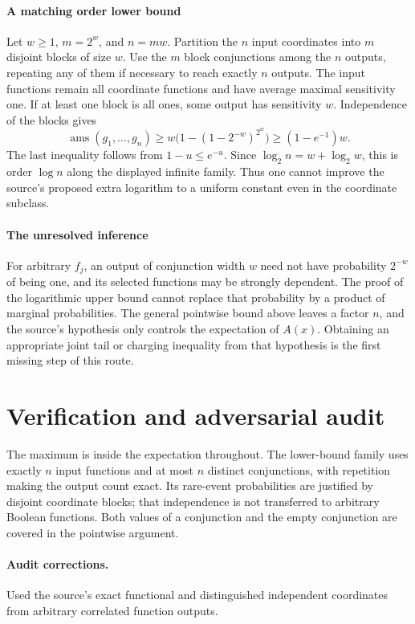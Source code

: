 \documentclass[11pt]{article}
\begin{document}
\paragraph{A matching order lower bound}
Let $w\geq1$, $m=2^w$, and $n=mw$. Partition the $n$ input coordinates into $m$ disjoint blocks of size $w$. Use the $m$ block conjunctions among the $n$ outputs, repeating any of them if necessary to reach exactly $n$ outputs. The input functions remain all coordinate functions and have average maximal sensitivity one. If at least one block is all ones, some output has sensitivity $w$. Independence of the blocks gives
\[
 \operatorname{ams}(g_1,\ldots,g_n)
 \geq w\bigl(1-(1-2^{-w})^{2^w}\bigr)
 \geq(1-e^{-1})w.
\]
The last inequality follows from $1-u\leq e^{-u}$. Since $\log_2n=w+\log_2w$, this is order $\log n$ along the displayed infinite family. Thus one cannot improve the source's proposed extra logarithm to a uniform constant even in the coordinate subclass.

\paragraph{The unresolved inference}
For arbitrary $f_j$, an output of conjunction width $w$ need not have probability $2^{-w}$ of being one, and its selected functions may be strongly dependent. The proof of the logarithmic upper bound cannot replace that probability by a product of marginal probabilities. The general pointwise bound above leaves a factor $n$, and the source's hypothesis only controls the expectation of $A(x)$. Obtaining an appropriate joint tail or charging inequality from that hypothesis is the first missing step of this route.

\section{Verification and adversarial audit}
The maximum is inside the expectation throughout. The lower-bound family uses exactly $n$ input functions and at most $n$ distinct conjunctions, with repetition making the output count exact. Its rare-event probabilities are justified by disjoint coordinate blocks; that independence is not transferred to arbitrary Boolean functions. Both values of a conjunction and the empty conjunction are covered in the pointwise argument.
\paragraph{Audit corrections.} Used the source's exact functional and distinguished independent coordinates from arbitrary correlated function outputs.
\end{document}
